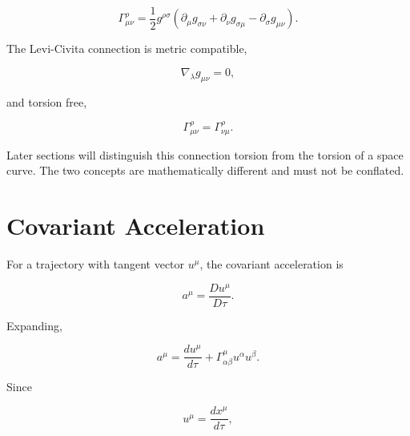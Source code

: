 \documentclass[12pt,oneside]{book}
\begin{document}
\begin{equation}
    \Gamma^\rho_{\mu\nu}
    =
    \frac{1}{2}
    g^{\rho\sigma}
    \left(
        \partial_\mu g_{\sigma\nu}
        +
        \partial_\nu g_{\sigma\mu}
        -
        \partial_\sigma g_{\mu\nu}
    \right).
    \label{eq:geometry-christoffel}
\end{equation}

The Levi-Civita connection is metric compatible,

\begin{equation}
    \nabla_\lambda g_{\mu\nu}
    =
    0,
    \label{eq:metric-compatibility}
\end{equation}

and torsion free,

\begin{equation}
    \Gamma^\rho_{\mu\nu}
    =
    \Gamma^\rho_{\nu\mu}.
    \label{eq:torsion-free-connection}
\end{equation}

Later sections will distinguish this connection torsion from the
torsion of a space curve. The two concepts are mathematically
different and must not be conflated.


\section{Covariant Acceleration}
\label{sec:covariant-acceleration}

For a trajectory with tangent vector \(u^\mu\), the covariant
acceleration is

\begin{equation}
    a^\mu
    =
    \frac{D u^\mu}{D\tau}.
    \label{eq:covariant-acceleration}
\end{equation}

Expanding,

\begin{equation}
    a^\mu
    =
    \frac{d u^\mu}{d\tau}
    +
    \Gamma^\mu_{\alpha\beta}
    u^\alpha u^\beta.
    \label{eq:covariant-acceleration-expanded}
\end{equation}

Since

\begin{equation}
    u^\mu
    =
    \frac{dx^\mu}{d\tau},
\end{equation}
\end{document}
